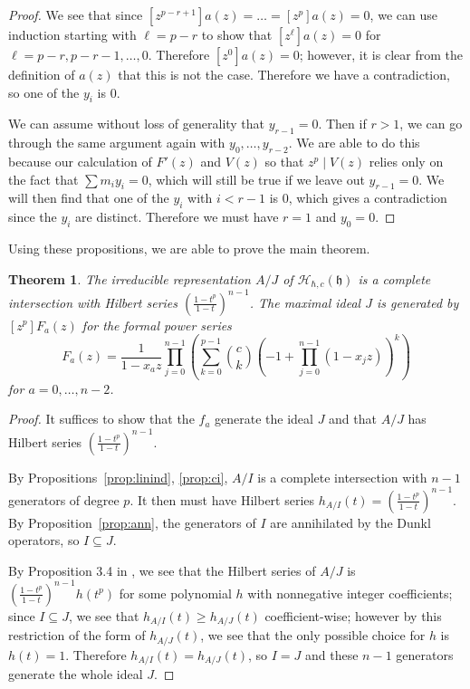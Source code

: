 \documentclass{article}
\numberwithin{equation}{section}
\newtheorem{theorem}[equation]{Theorem}
\newcommand{\h}{\mathfrak{h}}
\newcommand{\HH}{\mathcal{H}}
\begin{document}
\begin{proof}
We see that since $[z^{p-r+1}]a(z)=\dots=[z^p]a(z)=0$, we can use induction starting with $\ell=p-r$ to show that $[z^\ell]a(z)=0$ for $\ell=p-r,p-r-1,\dots,0$. Therefore $[z^0]a(z)=0$; however, it is clear from the definition of $a(z)$ that this is not the case. Therefore we have a contradiction, so one of the $y_i$ is $0$.

We can assume without loss of generality that $y_{r-1}=0$. Then if $r>1$, we can go through the same argument again with $y_0,\dots,y_{r-2}$. We are able to do this because our calculation of $F'(z)$ and $V(z)$ so that $z^p \mid V(z)$ relies only on the fact that $\sum m_iy_i=0$, which will still be true if we leave out $y_{r-1}=0$. We will then find that one of the $y_i$ with $i < r-1$ is $0$, which gives a contradiction since the $y_i$ are distinct. Therefore we must have $r=1$ and $y_0=0$. 



\end{proof}

Using these propositions, we are able to prove the main theorem.

\begin{theorem}\label{thm:main} The irreducible representation $A/J$  of $\HH_{\hbar,c}(\h)$ is a complete intersection with  Hilbert series $\left(\frac{1-t^p}{1-t}\right)^{n-1}$. The maximal ideal $J$ is generated by $[z^p]F_a(z)$ for the formal power series $$F_a(z)=\frac{1}{1-x_az} \prod_{j=0}^{n-1}\left( \sum_{k=0}^{p-1} \binom{c}{k}(-1+\prod_{j=0}^{n-1} (1-x_jz))^k\right)$$ for $a=0,\dots,n-2$.  \end{theorem} 

\begin{proof} It suffices to show that the $f_a$ generate the ideal $J$ and that $A/J$ has Hilbert series $\left(\frac{1-t^p}{1-t}\right)^{n-1}$. 

By Propositions~\ref{prop:linind}, \ref{prop:ci}, $A/I$ is a complete intersection with $n-1$ generators of degree $p$. It then must have Hilbert series $h_{A/I}(t)=\left(\frac{1-t^p}{1-t}\right)^{n-1}$. By Proposition~\ref{prop:ann}, the generators of $I$ are annihilated by the Dunkl operators, so $I \subseteq J$.

By Proposition 3.4 in \cite{BC1}, we see that the Hilbert series of $A/J$ is $\left(\frac{1-t^p}{1-t}\right)^{n-1}h(t^p)$ for some polynomial $h$ with nonnegative integer coefficients; since $I \subseteq J$, we see that $h_{A/I}(t) \ge h_{A/J}(t)$ coefficient-wise; however by this restriction of the form of $h_{A/J}(t)$, we see that the only possible choice for $h$ is $h(t)=1$. Therefore $h_{A/I}(t)=h_{A/J}(t)$, so $I=J$ and these $n-1$ generators generate the whole ideal $J$.

\end{proof}
\end{document}
